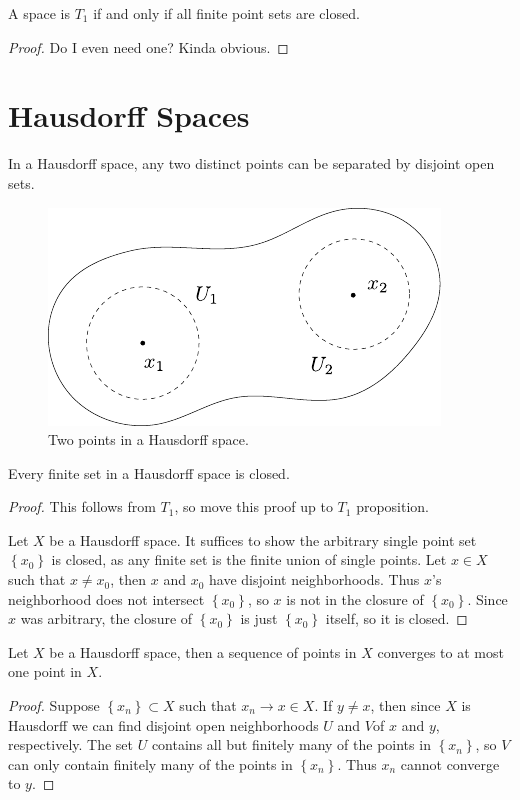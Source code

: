\documentclass[10pt]{report}
\begin{document}
\begin{cor}
	A space is $T_1$ if and only if all finite point sets are closed.
\end{cor}
\begin{proof}
	{\color{red}Do I even need one? Kinda obvious.}
\end{proof}


\section{Hausdorff Spaces}

In a Hausdorff space, any two distinct points can be separated by disjoint open sets.

\begin{figure}[H]
	\centering
	\includegraphics[scale=1]{fig/hausdorff.pdf}
	\caption{Two points in a Hausdorff space.}
\end{figure}


\begin{prop}
	Every finite set in a Hausdorff space is closed.
\end{prop}
\begin{proof}
	{\color{red}This follows from $T_1$, so move this proof up to $T_1$ proposition.}

	Let $X$ be a Hausdorff space. It suffices to show the arbitrary single point set $\left\{ x_0 \right\}$ is closed, as any finite set is the finite union of single points. Let $x \in X$ such that $x \neq x_0$, then $x$ and $x_0$ have disjoint neighborhoods. Thus $x$'s neighborhood does not intersect $\left\{ x_0 \right\}$, so $x$ is not in the closure of $\left\{ x_0 \right\}$. Since $x$ was arbitrary, the closure of $\left\{ x_0 \right\}$ is just $\left\{ x_0 \right\}$ itself, so it is closed.
\end{proof}

\begin{prop}
	Let $X$ be a Hausdorff space, then a sequence of points in $X$ converges to at most one point in $X$.
\end{prop}
\begin{proof}
	Suppose $\left\{ x_n \right\} \subset X$ such that $x_n \to x \in X$. If $y \neq x$, then since $X$ is Hausdorff we can find disjoint open neighborhoods $U$ and $V$of $x$ and $y$, respectively. The set $U$ contains all but finitely many of the points in $\left\{ x_n \right\}$, so $V$ can only contain finitely many of the points in $\left\{ x_n \right\}$. Thus $x_n$ cannot converge to $y$.
\end{proof}
\end{document}
